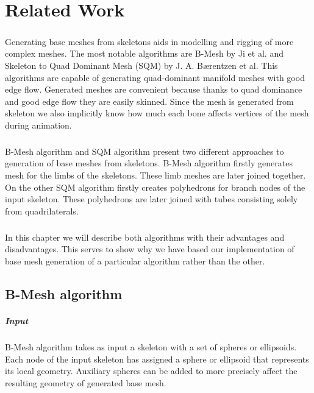 \chapter{Related Work}
\paragraph{}
Generating base meshes from skeletons aids in modelling and rigging of more complex meshes. The most notable algorithms are B-Mesh\cite{ji_bm} by Ji et al. and Skeleton to Quad Dominant Mesh\cite{sqm_phd} (SQM) by J. A. Bærentzen et al. This algorithms are capable of generating quad-dominant manifold meshes with good edge flow. Generated meshes are convenient because thanks to quad dominance and good edge flow they are easily skinned. Since the mesh is generated from skeleton we also implicitly know how much each bone affects vertices of the mesh during animation.
\paragraph{}
B-Mesh algorithm and SQM algorithm present two different approaches to generation of base meshes from skeletons. B-Mesh algorithm firstly generates mesh for the limbs of the skeletons. These limb meshes are later joined together. On the other SQM algorithm firstly creates polyhedrons for branch nodes of the input skeleton. These polyhedrons are later joined with tubes consisting solely from quadrilaterals.
\paragraph{}
In this chapter we will describe both algorithms with their advantages and disadvantages. This serves to show why we have based our implementation of base mesh generation of a particular algorithm rather than the other.
\pagebreak

\section{B-Mesh algorithm}
\paragraph{Input}
B-Mesh algorithm takes as input a skeleton with a set of spheres or ellipsoids. Each node of the input skeleton has assigned a sphere or ellipsoid that represents its local geometry. Auxiliary spheres can be added to more precisely affect the resulting geometry of generated base mesh.
